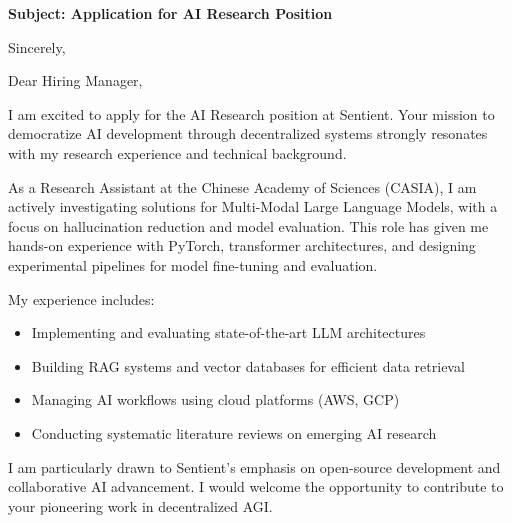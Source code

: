 \documentclass[11pt,a4paper,roman]{moderncv}
\begin{document}
\date{\today}
\opening{\textbf{Subject: Application for AI Research Position}}
\closing{Sincerely,}

\makelettertitle

Dear Hiring Manager,

I am excited to apply for the AI Research position at Sentient. Your mission to democratize AI development through decentralized systems strongly resonates with my research experience and technical background.

As a Research Assistant at the Chinese Academy of Sciences (CASIA), I am actively investigating solutions for Multi-Modal Large Language Models, with a focus on hallucination reduction and model evaluation. This role has given me hands-on experience with PyTorch, transformer architectures, and designing experimental pipelines for model fine-tuning and evaluation.

My experience includes:
\begin{itemize}
\item Implementing and evaluating state-of-the-art LLM architectures
\item Building RAG systems and vector databases for efficient data retrieval
\item Managing AI workflows using cloud platforms (AWS, GCP)
\item Conducting systematic literature reviews on emerging AI research
\end{itemize}

I am particularly drawn to Sentient's emphasis on open-source development and collaborative AI advancement. I would welcome the opportunity to contribute to your pioneering work in decentralized AGI.

\makeletterclosing
\end{document}
